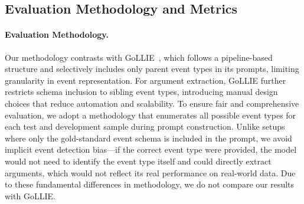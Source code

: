 
\subsection{Evaluation Methodology and Metrics}
\paragraph{Evaluation Methodology.} 
Our methodology contrasts with GoLLIE~\cite{cite_gollie}, which follows a pipeline-based structure and selectively includes only parent event types in its prompts, limiting granularity in event representation. For argument extraction, GoLLIE further restricts schema inclusion to sibling event types, introducing manual design choices that reduce automation and scalability. To ensure fair and comprehensive evaluation, we adopt a methodology that enumerates all possible event types for each test and development sample during prompt construction. Unlike setups where only the gold-standard event schema is included in the prompt, we avoid implicit event detection bias—if the correct event type were provided, the model would not need to identify the event type itself and could directly extract arguments, which would not reflect its real performance on real-world data. Due to these fundamental differences in methodology, we do not compare our results with GoLLIE.


